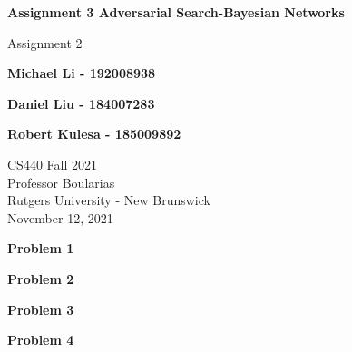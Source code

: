 \documentclass[11pt]{article}
\begin{document}
    \begin{titlepage}
        \begin{center}
            \vspace{1cm}

            \Huge
            \textbf{Assignment 3 Adversarial Search-Bayesian Networks}

            \vspace{0.5cm}
            \LARGE
            Assignment 2

            \vspace{1cm}

            \textbf{Michael Li - 192008938}

            \textbf{Daniel Liu - 184007283}

            \textbf{Robert Kulesa - 185009892}


            \vfill


            \vspace{0.8cm}

            \Large
            CS440 Fall 2021\\
            Professor Boularias\\
            Rutgers University - New Brunswick\\
            November 12, 2021

        \end{center}
    \end{titlepage}

    \begin{center}
        \Large
        \textbf{Problem 1}
    \end{center}
    \normalsize


    \begin{center}
        \Large
        \textbf{Problem 2}
    \end{center}
    \normalsize
    \begin{enumerate}

        
    \end{enumerate}

    \begin{center}
        \Large
        \textbf{Problem 3}
    \end{center}
    \normalsize
    \begin{enumerate}

    \end{enumerate}

    \begin{center}
        \Large
        \textbf{Problem 4}
    \end{center}
    \normalsize
    \begin{enumerate}

    \end{enumerate}


    
\end{document}
